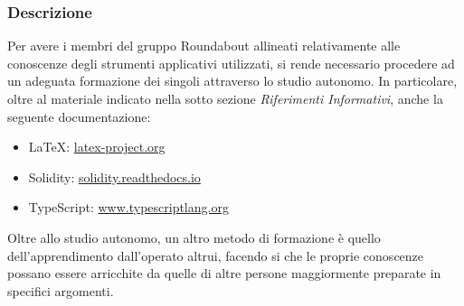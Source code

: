 		\subsubsection{Descrizione}		
		Per avere i membri del gruppo Roundabout allineati relativamente alle conoscenze degli strumenti applicativi utilizzati, si rende necessario procedere ad un adeguata formazione dei singoli attraverso lo studio autonomo. In particolare, oltre al materiale indicato nella sotto sezione \textit{Riferimenti Informativi}, anche la seguente documentazione:
		\begin{itemize}
			\item \LaTeX{}: \href{latex-project.org}{latex-project.org}
			\item Solidity: \href{solidity.readthedocs.io}{solidity.readthedocs.io}
			\item TypeScript: \href{www.typescriptlang.org}{www.typescriptlang.org}
		\end{itemize}
		Oltre allo studio autonomo, un altro metodo di formazione è quello dell'apprendimento dall'operato altrui, facendo si che le proprie conoscenze possano essere arricchite da quelle di altre persone maggiormente preparate in specifici argomenti.
